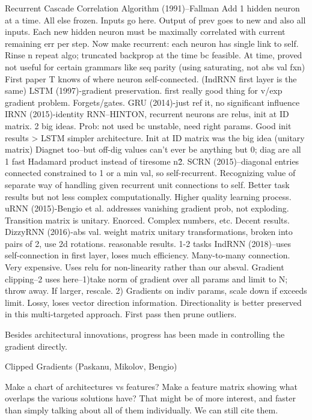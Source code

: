 \documentclass{article}
\begin{document}
Recurrent Cascade Correlation Algorithm (1991)--Fallman
Add 1 hidden neuron at a time.  All else frozen.  Inputs go here.  Output of prev goes to new and also all inputs. Each new hidden neuron must be maximally correlated with current remaining err per step.  Now make recurrent: each neuron has single link to self.  Rinse n repeat algo; truncated backprop at the time bc feasible.  At time, proved not useful for certain grammars like seq parity (using saturating, not abs val fxn) First paper T knows of where neuron self-connected. (IndRNN first layer is the same)
LSTM (1997)-gradient preservation. first really good thing for v/exp gradient problem.  Forgets/gates. 
GRU (2014)-just ref it, no significant influence
IRNN (2015)-identity RNN--HINTON, recurrent neurons are relus, init at ID matrix. 2 big ideas. Prob: not used bc unstable, need right params.  Good init results > LSTM simpler architecture. Init at ID matrix was the big idea (unitary matrix) Diagnet too--but off-dig values can't ever be anything but 0; diag are all 1 fast Hadamard product instead of tiresome n\^2.
SCRN (2015)--diagonal entries connected constrained to 1 or a min val, so self-recurrent.  Recognizing value of separate way of handling given recurrent unit connections to self.  Better task results but not less complex computationally. Higher quality learning process.
uRNN (2015)-Bengio et al.  addresses vanishing gradient prob, not exploding.  Transition matrix is unitary.  Enorced.  Complex numbers, etc. Decent results.
DizzyRNN (2016)-abs val. weight matrix unitary transformations, broken into pairs of 2, use 2d rotations. reasonable results. 1-2 tasks 
IndRNN  (2018)--uses self-connection in first layer, loses much efficiency.  Many-to-many connection. Very expensive.  Uses relu for non-linearity rather than our absval.  
Gradient clipping--2 uses here--1)take norm of gradient over all params and limit to N; throw away.  If larger, rescale.  2) Gradients on indiv params, scale down if exceeds limit.  Lossy, loses vector direction information. Directionality is better preserved in this multi-targeted approach. First pass then prune outliers.    

Besides architectural innovations, progress has been made in controlling the gradient directly.

Clipped Gradients (Paskanu, Mikolov, Bengio)

Make a chart of architectures vs features?
Make a feature matrix showing what overlaps the various solutions have? That might be of more interest, and faster than simply talking about all of them individually. We can still cite them.
\end{document}
